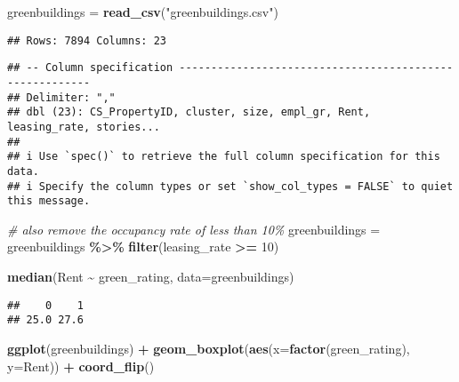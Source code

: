 \documentclass[
]{article}
\newenvironment{Shaded}{\begin{snugshade}}{\end{snugshade}}
\newcommand{\AttributeTok}[1]{\textcolor[rgb]{0.13,0.29,0.53}{#1}}
\newcommand{\CommentTok}[1]{\textcolor[rgb]{0.56,0.35,0.01}{\textit{#1}}}
\newcommand{\DecValTok}[1]{\textcolor[rgb]{0.00,0.00,0.81}{#1}}
\newcommand{\FunctionTok}[1]{\textcolor[rgb]{0.13,0.29,0.53}{\textbf{#1}}}
\newcommand{\NormalTok}[1]{#1}
\newcommand{\OtherTok}[1]{\textcolor[rgb]{0.56,0.35,0.01}{#1}}
\newcommand{\SpecialCharTok}[1]{\textcolor[rgb]{0.81,0.36,0.00}{\textbf{#1}}}
\newcommand{\StringTok}[1]{\textcolor[rgb]{0.31,0.60,0.02}{#1}}
\begin{document}
\begin{Shaded}
\begin{Highlighting}[]
\NormalTok{greenbuildings }\OtherTok{=} \FunctionTok{read\_csv}\NormalTok{(}\StringTok{"greenbuildings.csv"}\NormalTok{)}
\end{Highlighting}
\end{Shaded}

\begin{verbatim}
## Rows: 7894 Columns: 23
\end{verbatim}

\begin{verbatim}
## -- Column specification --------------------------------------------------------
## Delimiter: ","
## dbl (23): CS_PropertyID, cluster, size, empl_gr, Rent, leasing_rate, stories...
## 
## i Use `spec()` to retrieve the full column specification for this data.
## i Specify the column types or set `show_col_types = FALSE` to quiet this message.
\end{verbatim}

\begin{Shaded}
\begin{Highlighting}[]
\CommentTok{\# also remove the occupancy rate of less than 10\%}
\NormalTok{greenbuildings }\OtherTok{=}\NormalTok{ greenbuildings }\SpecialCharTok{\%\textgreater{}\%} \FunctionTok{filter}\NormalTok{(}\StringTok{\textquotesingle{}leasing\_rate\textquotesingle{}} \SpecialCharTok{\textgreater{}=} \DecValTok{10}\NormalTok{)}

\FunctionTok{median}\NormalTok{(Rent }\SpecialCharTok{\textasciitilde{}}\NormalTok{ green\_rating, }\AttributeTok{data=}\NormalTok{greenbuildings)}
\end{Highlighting}
\end{Shaded}

\begin{verbatim}
##    0    1 
## 25.0 27.6
\end{verbatim}

\begin{Shaded}
\begin{Highlighting}[]
\FunctionTok{ggplot}\NormalTok{(greenbuildings) }\SpecialCharTok{+} 
  \FunctionTok{geom\_boxplot}\NormalTok{(}\FunctionTok{aes}\NormalTok{(}\AttributeTok{x=}\FunctionTok{factor}\NormalTok{(green\_rating), }\AttributeTok{y=}\NormalTok{Rent)) }\SpecialCharTok{+} 
  \FunctionTok{coord\_flip}\NormalTok{()}
\end{Highlighting}
\end{Shaded}
\end{document}
